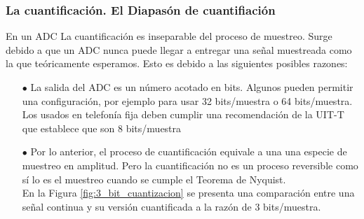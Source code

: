 \subsubsection{La cuantificación. El Diapasón de cuantifiación}
En un ADC La cuantificación es inseparable del proceso de muestreo. Surge debido a que un ADC nunca puede llegar a entregar una señal muestreada como la que teóricamente esperamos. Esto es debido a las siguientes posibles razones:
\begin{itemize}
	\item [$\bullet$] La salida del ADC es un número acotado en bits. Algunos pueden permitir una configuración, por ejemplo para usar 32 bits/muestra o 64 bits/muestra. Los usados en telefonía fija deben cumplir una recomendación de la UIT-T que establece que son 8 bits/muestra 
    \item [$\bullet$]Por lo anterior, el proceso de cuantificación equivale a una una especie de muestreo en amplitud. Pero la cuantificación no es un proceso reversible como sí lo es el muestreo cuando se cumple el Teorema de Nyquist. \\
    
En la Figura \ref{fig:3_bit_cuantizacion} se presenta una comparación entre una señal continua y su versión cuantificada a la razón de 3 bits/muestra.


\end{itemize}
